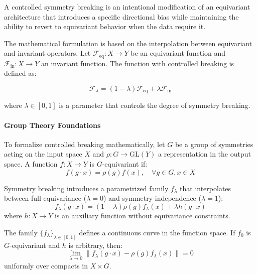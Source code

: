 \begin{definition}
A controlled symmetry breaking is an intentional modification of an equivariant architecture that introduces a specific directional bias while maintaining the ability to revert to equivariant behavior when the data require it.
\end{definition}

The mathematical formulation is based on the interpolation between equivariant and invariant operators. Let $\mathcal{F}_{\text{eq}}: X \to Y$ be an equivariant function and $\mathcal{F}_{\text{in}}: X \to Y$ an invariant function. The function with controlled breaking is defined as:

\begin{equation}
\mathcal{F}_\lambda = (1-\lambda) \mathcal{F}_{\text{eq}} + \lambda \mathcal{F}_{\text{in}}
\end{equation}

where $\lambda \in [0,1]$ is a parameter that controls the degree of symmetry breaking.

\paragraph{Group Theory Foundations}

To formalize controlled breaking mathematically, let $G$ be a group of symmetries acting on the input space $X$ and $\rho: G \to \text{GL}(Y)$ a representation in the output space. A function $f: X \to Y$ is $G$-equivariant if:
\begin{equation}
f(g \cdot x) = \rho(g) f(x), \quad \forall g \in G, x \in X
\end{equation}

Symmetry breaking introduces a parametrized family $f_\lambda$ that interpolates between full equivariance ($\lambda = 0$) and symmetry independence ($\lambda = 1$):
\begin{equation}
f_\lambda(g \cdot x) = (1-\lambda) \rho(g) f_\lambda(x) + \lambda h(g \cdot x)
\end{equation}
where $h: X \to Y$ is an auxiliary function without equivariance constraints.

\begin{proposition}
The family $\{f_\lambda\}_{\lambda \in [0,1]}$ defines a continuous curve in the function space. If $f_0$ is $G$-equivariant and $h$ is arbitrary, then:
\begin{equation}
\lim_{\lambda \to 0} \|f_\lambda(g \cdot x) - \rho(g) f_\lambda(x)\| = 0
\end{equation}
uniformly over compacts in $X \times G$.
\end{proposition}

